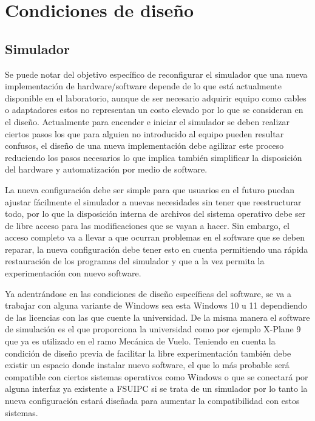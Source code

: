 \documentclass[12pt]{report}
\begin{document}
\chapter{Condiciones de diseño}

\section{Simulador}

Se puede notar del objetivo específico de reconfigurar el simulador que una nueva implementación de hardware/software depende de lo que está actualmente disponible en el laboratorio, aunque de ser necesario adquirir equipo como cables o adaptadores estos no representan un costo elevado por lo que se consideran en el diseño. Actualmente para encender e iniciar el simulador se deben realizar ciertos pasos los que para alguien no introducido al equipo pueden resultar confusos, el diseño de una nueva implementación debe agilizar este proceso reduciendo los pasos necesarios lo que implica también simplificar la disposición del hardware y automatización por medio de software.

La nueva configuración debe ser simple para que usuarios en el futuro puedan ajustar fácilmente el simulador a nuevas necesidades sin tener que reestructurar todo, por lo que la disposición interna de archivos del sistema operativo debe ser de libre acceso para las modificaciones que se vayan a hacer. Sin embargo, el acceso completo va a llevar a que ocurran problemas en el software que se deben reparar, la nueva configuración debe tener esto en cuenta permitiendo una rápida restauración de los programas del simulador y que a la vez permita la experimentación con nuevo software.

Ya adentrándose en las condiciones de diseño específicas del software, se va a trabajar con alguna variante de Windows sea esta Windows 10 u 11 dependiendo de las licencias con las que cuente la universidad. De la misma manera el software de simulación es el que proporciona la universidad como por ejemplo X-Plane 9 que ya es utilizado en el ramo Mecánica de Vuelo. Teniendo en cuenta la condición de diseño previa de facilitar la libre experimentación también debe existir un espacio donde instalar nuevo software, el que lo más probable será compatible con ciertos sistemas operativos como Windows o que se conectará por alguna interfaz ya existente a FSUIPC si se trata de un simulador por lo tanto la nueva configuración estará diseñada para aumentar la compatibilidad con estos sistemas.
\end{document}
